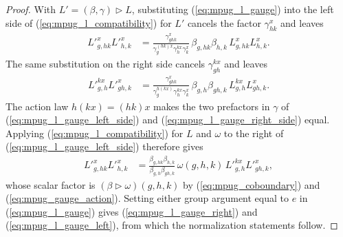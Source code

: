 \begin{proof}\leanok
    With $L'=(\beta,\gamma)\mathbin{\triangleright}L$, substituting
    (\ref{eq:mpug_l_gauge}) into the left side of
    (\ref{eq:mpug_l_compatibility}) for $L'$ cancels the factor
    $\gamma^x_{hk}$ and leaves
    \begin{align}
        {L'}^x_{g,hk}{L'}^x_{h,k}
         & =\frac{\gamma^x_{ghk}}
            {\gamma^{(hk)x}_g\gamma^{k x}_h\gamma^x_k}\,
        \beta_{g,hk}\beta_{h,k}\,L^x_{g,hk}L^x_{h,k}.
        \label{eq:mpug_l_gauge_left_side}
    \end{align}
    The same substitution on the right side cancels
    $\gamma^{k x}_{gh}$ and leaves
    \begin{align}
        {L'}^{k x}_{g,h}{L'}^x_{gh,k}
         & =\frac{\gamma^x_{ghk}}
            {\gamma^{h(k x)}_g\gamma^{k x}_h\gamma^x_k}\,
        \beta_{g,h}\beta_{gh,k}\,L^{k x}_{g,h}L^x_{gh,k}.
        \label{eq:mpug_l_gauge_right_side}
    \end{align}
    The action law $h(k x)=(hk)x$ makes the two prefactors in $\gamma$ of
    (\ref{eq:mpug_l_gauge_left_side}) and
    (\ref{eq:mpug_l_gauge_right_side}) equal. Applying
    (\ref{eq:mpug_l_compatibility}) for $L$ and $\omega$ to the right of
    (\ref{eq:mpug_l_gauge_left_side}) therefore gives
    \begin{align}
        {L'}^x_{g,hk}{L'}^x_{h,k}
         & =\frac{\beta_{g,hk}\beta_{h,k}}
            {\beta_{g,h}\beta_{gh,k}}\,\omega(g,h,k)\,
                                                     {L'}^{k x}_{g,h}{L'}^x_{gh,k},
        \label{eq:mpug_l_gauge_compatibility}
    \end{align}
    whose scalar factor is
    $(\beta\mathbin{\triangleright}\omega)(g,h,k)$ by
    (\ref{eq:mpug_coboundary}) and
    (\ref{eq:mpug_gauge_action}). Setting either group argument equal
    to $e$ in (\ref{eq:mpug_l_gauge}) gives
    (\ref{eq:mpug_l_gauge_right}) and
    (\ref{eq:mpug_l_gauge_left}), from which the normalization statements
    follow.
\end{proof}

